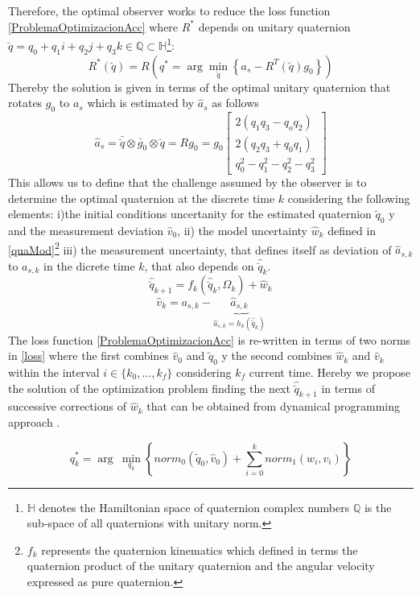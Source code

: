 \documentclass[10pt,conference]{IEEEtran}
\begin{document}
Therefore, the optimal observer works  to reduce the loss function \eqref{ProblemaOptimizacionAcc} where $R^*$ depends on unitary quaternion $\breve{q}=q_0+q_1i+q_2j+q_3k \in \mathbb{Q} \subset \mathbb{H}$\footnote{$\mathbb{H}$ denotes the Hamiltonian space of quaternion complex numbers $\mathbb{Q}$ is the sub-space of all quaternions with unitary norm.}:
\begin{equation}\label{ProblemaOptimizacionAcc}
R^*(\breve{q})=R\left(q^*=\arg\min_{\breve{q}}\left\{a_s-R^T(\breve{q})g_0\right\}\right)
\end{equation} 
Thereby the solution is given in terms of the optimal unitary quaternion that rotates $g_0$ to $a_s$ which is estimated by $\hat{a}_s$ as follows%
\begin{equation}\label{chap2:ModeloMedicion}
\hat{a}_s=\bar{\breve{q}}\otimes\breve{g_0}\otimes\breve{q}=Rg_0=g_0\begin{bmatrix}2(q_1q_3-q_oq_2)\\2(q_2q_3+q_0q_1)\\q_0^2-q_1^2-q_2^2-q_3^2\end{bmatrix}
\end{equation}
This allows us to define that the challenge assumed by the observer is to determine the optimal quaternion at the discrete time $k$ considering the following elements: i)the initial conditions uncertanity for the estimated quaternion $\tilde{q}_0$ y and the measurement deviation $\hat{v}_0$, ii) the model uncertainty $\hat{w}_k$ defined in \eqref{quaMod}\footnote{$f_k$ represents the quaternion kinematics which defined in terms the quaternion product of the unitary quaternion and the angular velocity expressed as pure quaternion.}
iii) the measurement uncertainty, that defines itself as deviation of $\hat{a}_{s,k}$ to $a_{s,k}$ in the dicrete time $k$, that also depends on $\hat{\breve{q}}_{k}$.
\begin{equation}
\label{quaMod}
\hat{\breve{q}}_{k+1}=f_k(\hat{\breve{q}}_k,\Omega_k)+\hat{w}_k
\end{equation}
\begin{equation}
\hat{v}_k=a_{s,k}-\underbrace{\hat{a}_{s,k}}_{\hat{a}_{s,k}=h_k(\hat{\breve{q}}_k)}
\end{equation}
The loss function \eqref{ProblemaOptimizacionAcc} is re-written in terms of two norms in \eqref{loss} where the first combines $\hat{v}_0$ and $\tilde{q}_0$ y the second combines $\hat{w}_k$ and $\hat{v}_k$ within the interval $i\in\{k_0,...,k_f\}$ considering $k_f$ current time. Hereby we propose the solution of the optimization problem finding the next $\hat{\breve{q}}_{k+1}$ in terms of successive corrections of $\hat{w}_k$  that can be obtained from dynamical programming approach \cite{Lewis2012}.\par
\begin{equation}\label{loss}
q^*_k=\arg~\min_{q_k}\left\{norm_0(\tilde{q}_0,\hat{v}_0)+\sum^k_{i=0}norm_1(w_i,v_i)\right\}
\end{equation}
\end{document}
